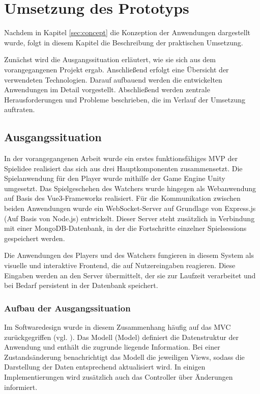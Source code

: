 \chapter{Umsetzung des Prototyps}\label{sec:realisation}

Nachdem in Kapitel \ref{sec:concept} die Konzeption der Anwendungen dargestellt wurde, folgt in diesem Kapitel die Beschreibung der praktischen Umsetzung.

Zunächst wird die Ausgangssituation erläutert, wie sie sich aus dem vorangegangenen Projekt ergab. Anschließend erfolgt eine Übersicht der verwendeten Technologien. Darauf aufbauend werden die entwickelten Anwendungen im Detail vorgestellt. Abschließend werden zentrale Herausforderungen und Probleme beschrieben, die im Verlauf der Umsetzung auftraten.

\section{Ausgangssituation}

In der vorangegangenen Arbeit wurde ein erstes funktionsfähiges \ac{MVP} der Spielidee realisiert das sich aus drei Hauptkomponenten zusammensetzt. Die Spielanwendung für den Player wurde mithilfe der Game Engine Unity umgesetzt. Das Spielgeschehen des Watchers wurde hingegen als Webanwendung auf Basis des Vue3-Frameworks realisiert. Für die Kommunikation zwischen beiden Anwendungen wurde ein WebSocket-Server auf Grundlage von Express.js (Auf Basis von Node.js) entwickelt. Dieser Server steht zusätzlich in Verbindung mit einer MongoDB-Datenbank, in der die Fortschritte einzelner Spielsessions gespeichert werden.

Die Anwendungen des Players und des Watchers fungieren in diesem System als visuelle und interaktive Frontend, die auf Nutzereingaben reagieren. Diese Eingaben werden an den Server übermittelt, der sie zur Laufzeit verarbeitet und bei Bedarf persistent in der Datenbank speichert.

\subsection{Aufbau der Ausgangssituation}

Im Softwaredesign wurde in diesem Zusammenhang häufig auf das \ac{MVC} zurückgegriffen (vgl. \citealp{GlossarWiki:Reenskaug:1979a}). Das Modell (Model) definiert die Datenstruktur der Anwendung und enthält die zugrunde liegende Information. Bei einer Zustandsänderung benachrichtigt das Modell die jeweiligen Views, sodass die Darstellung der Daten entsprechend aktualisiert wird. In einigen Implementierungen wird zusätzlich auch das Controller über Änderungen informiert.

